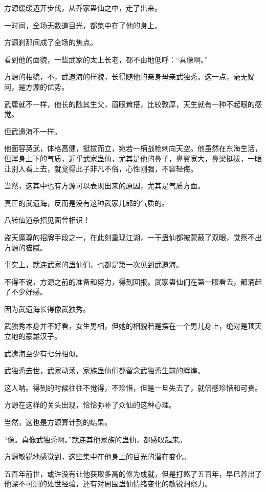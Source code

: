 
\begin{this_body}

方源缓缓迈开步伐，从乔家蛊仙之中，走了出来。

一时间，全场无数道目光，都集中在了他的身上。

方源刹那间成了全场的焦点。

看到他的面貌，一些武家的太上长老，都不由地低呼：“真像啊。”

方源的相貌，不，武遗海的样貌，长得随他的亲身母亲武独秀。这一点，毫无疑问，是方源的优势。

武庸就不一样，他长的随其生父，眉眼耸搭，比较敦厚，天生就有一种不起眼的感觉。

但武遗海不一样。

他面容英武，体格高健，挺拔而立，宛若一柄战枪刺向天空。他虽然在东海生活，但浑身上下的气质，近乎武家蛊仙，尤其是他的鼻子，鼻翼宽大，鼻梁挺拔，一眼让别人看上去，就觉得此子非凡不俗，心性刚强，不容轻侮。

当然，这其中也有方源可以表现出来的原因，尤其是气质方面。

真正的武遗海，反而是没有这种武家儿郎的气质的。

八转仙道杀招见面曾相识！

盗天魔尊的招牌手段之一，在此刻重现江湖，一干蛊仙都被蒙蔽了双眼，觉察不出方源的猫腻。

事实上，就连武家的蛊仙们，也都是第一次见到武遗海。

不得不说，方源之前的准备和努力，得到回报。武家蛊仙们在第一眼看去，都涌起了不少好感。

因为武遗海长得像武独秀。

武独秀本身并不好看，女生男相，但她的相貌若是摆在一个男儿身上，绝对是顶天立地的豪雄汉子。

武遗海至少有七分相似。

武独秀去世，武家动荡，家族蛊仙们都留念武独秀生前的辉煌。

这人呐。得到的时候往往不觉得，不珍惜，但是一旦失去了，就倍感珍惜和可贵。

方源在这样的关头出现，恰恰弥补了众仙的这种心理。

当然，这也是方源算计到的结果。

“像。真像武独秀啊。”就连其他家族的蛊仙，都感叹起来。

方源敏锐地感觉到，这些集中在他身上的目光的潜在变化。

五百年前世，或许没有让他获取多高的修为成就，但是打熬了五百年，早已养出了他深不可测的处世经验，还有对周围蛊仙情绪变化的敏锐洞察力。


\end{this_body}
